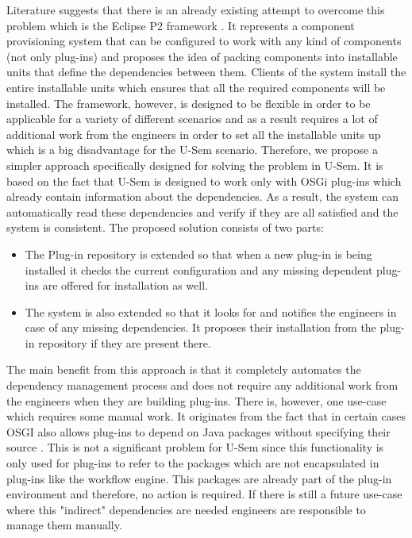 Literature suggests that there is an already existing attempt to overcome this problem which is the Eclipse P2 framework \cite{le2009dependency}. It represents a component provisioning system that can be configured to work with any kind of components (not only plug-ins) and proposes the idea of packing components into installable units that define the dependencies between them. Clients of the system install the entire installable units which ensures that all the required components will be installed. The framework, however, is designed to be flexible in order to be applicable for a variety of different scenarios and as a result requires a lot of additional work from the engineers in order to set all the installable units up which is a big disadvantage for the U-Sem scenario. Therefore, we propose a simpler approach specifically designed for solving the problem in U-Sem. It is based on the fact that U-Sem is designed to work only with OSGi plug-ins which already contain information about the dependencies. As a result, the system can automatically read these dependencies and verify if they are all satisfied and the system is consistent. The proposed solution consists of two parts:

\begin{itemize}
	\item The Plug-in repository is extended so that when a new plug-in is being installed it checks the current configuration and any missing dependent plug-ins are offered for installation as well.
	\item The system is also extended so that it looks for and notifies the engineers in case of any missing dependencies. It  proposes their installation from the plug-in repository if they are present there.
\end{itemize}


The main benefit from this approach is that it completely automates the dependency management process and does not require any additional work from the engineers when they are building plug-ins. There is, however, one use-case which requires some manual work. It originates from the fact that in certain cases OSGI also allows plug-ins to depend on Java packages without specifying their source \cite{bartlett2009osgi}. This is not a significant problem for U-Sem since this functionality is only used for plug-ins to refer to the packages which are not encapsulated in plug-ins like the workflow engine. This packages are already part of the plug-in environment and therefore, no action is required. If there is still a future use-case where this "indirect" dependencies are needed engineers are responsible to manage them manually.


